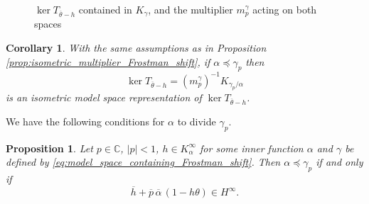 \documentclass{article}
\numberwithin{equation}{section}
\theoremstyle{plain}
\newtheorem{prop}[thm]{Proposition}
\newtheorem{cor}[thm]{Corollary}
\newcommand{\Hinf}{\ensuremath{H^\infty}}
\newcommand{\CC}{\ensuremath{\mathbb{C}}}
\newcommand{\ol}[1]{\ensuremath{\overline{#1}}}
\begin{document}
\begin{figure}[H]
\centering
{}
\caption{$\ker T_{\ol\theta -h}$ contained in $K_\gamma$, and the multiplier $m_p^\gamma$ acting on both spaces}
\label{fig:diagram}
\end{figure}



\begin{cor}
\label{cor:Frostman_shift_isom_model_space_repres}
With the same assumptions as in Proposition \ref{prop:isometric_multiplier_Frostman_shift}, if $\alpha \preceq \gamma_p$ then
\begin{equation}
\ker T_{\ol\theta -h} = (m_p^\gamma)^{-1} K_{\gamma_p / \alpha}
\end{equation}
is an isometric model space representation of $\ker T_{\ol\theta -h}$.
\end{cor}


We have the following conditions for $\alpha$ to divide $\gamma_p$.


\begin{prop}
\label{prop:alpha_divides_gamma_p}
Let $p\in\CC$, $|p|<1$, $h\in K_\alpha^\infty$ for some inner function $\alpha$ and $\gamma$ be defined by \eqref{eq:model_space_containing_Frostman_shift}.
Then $\alpha \preceq \gamma_p$ if and only if
\begin{equation}
\label{eq:gamma_p_alpha_is_model_space}
\ol h + \ol p\, \ol\alpha \, (1 - h\theta) \in \Hinf.
\end{equation}
\end{prop}
\end{document}
